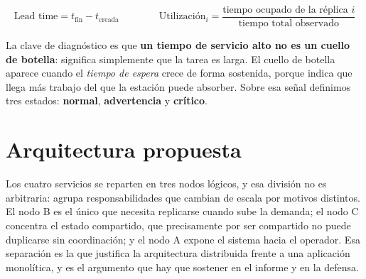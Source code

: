 \documentclass[11pt,a4paper]{article}
\begin{document}
\vspace{-4pt}
\[
\text{Lead time} = t_{\text{fin}} - t_{\text{creada}}
\qquad\qquad
\text{Utilización}_i = \frac{\text{tiempo ocupado de la réplica } i}{\text{tiempo total observado}}
\]

La clave de diagnóstico es que \textbf{un tiempo de servicio alto no es un cuello de botella}: significa simplemente que la tarea es larga. El cuello de botella aparece cuando el \emph{tiempo de espera} crece de forma sostenida, porque indica que llega más trabajo del que la estación puede absorber. Sobre esa señal definimos tres estados: \textbf{normal}, \textbf{advertencia} y \textbf{crítico}.

\section{Arquitectura propuesta}

Los cuatro servicios se reparten en tres nodos lógicos, y esa división no es arbitraria: agrupa responsabilidades que cambian de escala por motivos distintos. El nodo B es el único que necesita replicarse cuando sube la demanda; el nodo C concentra el estado compartido, que precisamente por ser compartido no puede duplicarse sin coordinación; y el nodo A expone el sistema hacia el operador. Esa separación es la que justifica la arquitectura distribuida frente a una aplicación monolítica, y es el argumento que hay que sostener en el informe y en la defensa.
\end{document}
